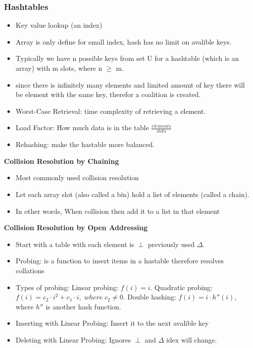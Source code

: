 \newpage
\begin{multicols}{2}
\subsubsection{Hashtables}
\begin{itemize}
\item  Key value lookup (an index) 
\item  Array is only define for small index, hash has no limit on avalible keys.
\item  Typically we have n possible keys from set U for a hashtable (which is an array)
  with m slots, where n $\geq$ m.
\item  since there is infinitely many elements and limited amount of key there will be element with
  the  same key, therefor a coalition is created.
\item  Worst-Case Retrieval: time complexity of retrieving a element.
\item  Load Factor: How much data is in the table $\frac{elements}{slots}$
\item  Rehashing: make the hastable more balanced. 
\end{itemize}

\textbf{Collision Resolution by Chaining}
\begin{itemize}
\item Most commonly used collision resolution
\item Let each array slot (also called a bin) hold a list of elements (called a chain).
\item In other words, When collision then add it to a list in that element
\end{itemize}


\textbf{Collision Resolution by Open Addressing}
\begin{itemize}
\item Start with a table with each element is $\perp$ previously used $\Delta$.  
\item Probing: is a function to insert items in a hastable therefore resolves collations
\item Types of probing: \newline
  Linear probing: $f (i)=i$. \newline
  Quadratic probing: $f (i)=c_2\cdot i^2+c_1\cdot i, \; where \; c_2 \neq{0}$. \newline
  Double hashing: $f (i)=i\cdot h'' (i)$, where $h''$ is another hash function. \newline
\item Inserting with Linear Probing: Insert it to the next avalible key 
\item Deleting with Linear Probing: Ignores  $\perp$ and $\Delta$ idex will change.  
\end{itemize}



\end{multicols}
